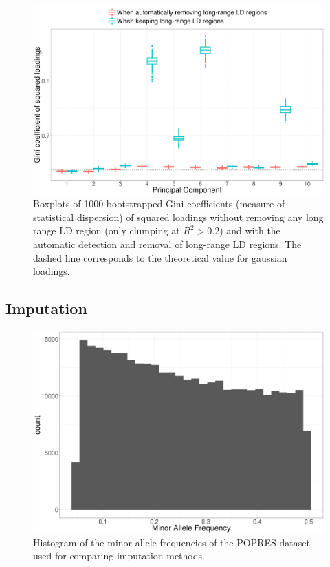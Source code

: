 \documentclass[a4paper, 11pt]{article}
\begin{document}
\begin{figure}[htpb]
\centerline{\includegraphics[width=\textwidth]{gini}}
\caption{Boxplots of 1000 bootstrapped Gini coefficients (measure of statistical dispersion) of squared loadings without removing any long range LD region (only clumping at $R^2 > 0.2$) and with the automatic detection and removal of long-range LD regions. The dashed line corresponds to the theoretical value for gaussian loadings.}\label{fig:gini}
\end{figure}

\newpage
\subsection{Imputation}

\begin{figure}[htpb]
\centerline{\includegraphics[width=\textwidth]{hist-maf}}
\caption{Histogram of the minor allele frequencies of the POPRES dataset used for comparing imputation methods.}\label{fig:maf}
\end{figure}
\end{document}
